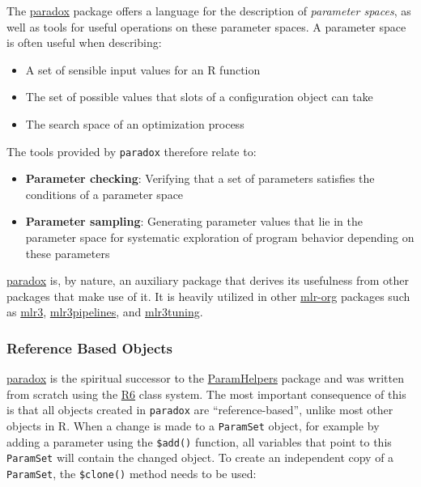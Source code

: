 \documentclass[]{article}
\providecommand{\tightlist}{%
  \setlength{\itemsep}{0pt}\setlength{\parskip}{0pt}}
\begin{document}
The \href{https://paradox.mlr-org.com}{paradox} package offers a language for the description of \emph{parameter spaces}, as well as tools for useful operations on these parameter spaces.
A parameter space is often useful when describing:

\begin{itemize}
\tightlist
\item
  A set of sensible input values for an R function
\item
  The set of possible values that slots of a configuration object can take
\item
  The search space of an optimization process
\end{itemize}

The tools provided by \texttt{paradox} therefore relate to:

\begin{itemize}
\tightlist
\item
  \textbf{Parameter checking}: Verifying that a set of parameters satisfies the conditions of a parameter space
\item
  \textbf{Parameter sampling}: Generating parameter values that lie in the parameter space for systematic exploration of program behavior depending on these parameters
\end{itemize}

\href{https://paradox.mlr-org.com}{paradox} is, by nature, an auxiliary package that derives its usefulness from other packages that make use of it.
It is heavily utilized in other \href{https://github.com/mlr-org}{mlr-org} packages such as \href{https://mlr3.mlr-org.com}{mlr3}, \href{https://mlr3pipelines.mlr-org.com}{mlr3pipelines}, and \href{https://mlr3tuning.mlr-org.com}{mlr3tuning}.

\hypertarget{reference-based-objects}{%
\subsubsection{Reference Based Objects}\label{reference-based-objects}}

\href{https://paradox.mlr-org.com}{paradox} is the spiritual successor to the \href{https://cran.r-project.org/package=ParamHelpers}{ParamHelpers} package and was written from scratch using the \href{https://cran.r-project.org/package=R6}{R6} class system.
The most important consequence of this is that all objects created in \texttt{paradox} are ``reference-based'', unlike most other objects in R.
When a change is made to a \texttt{ParamSet} object, for example by adding a parameter using the \texttt{\$add()} function, all variables that point to this \texttt{ParamSet} will contain the changed object.
To create an independent copy of a \texttt{ParamSet}, the \texttt{\$clone()} method needs to be used:
\end{document}

